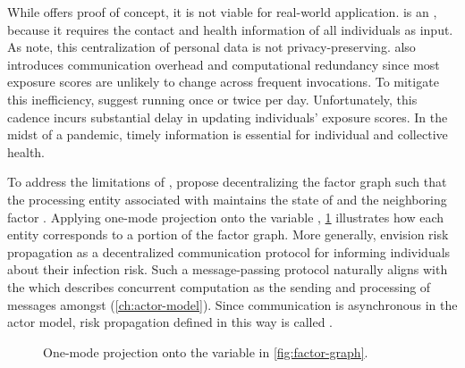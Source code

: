 While \cRiskPropagation offers proof of concept, it is not viable for real-world application. \cRiskPropagation is an  \citep{Cormen2022}, because it requires the contact and health information of all individuals as input. As \citet{Ayday2021} note, this centralization of personal data is not privacy-preserving. \cRiskPropagation also introduces communication overhead and computational redundancy since most exposure scores are unlikely to change across frequent invocations. To mitigate this inefficiency, \citet{Ayday2020} suggest running \cRiskPropagation once or twice per day. Unfortunately, this cadence incurs substantial delay in updating individuals' exposure scores. In the midst of a pandemic, timely information is essential for individual and collective health.

To address the limitations of \cRiskPropagation, \citet{Ayday2021} propose decentralizing the factor graph such that the processing entity associated with  maintains the state of  and the neighboring factor \verticesName. Applying one-mode projection onto the variable \verticesName \citep{Zhou2007}, \cref{fig:projected} illustrates how each entity corresponds to a portion of the factor graph. More generally, \citet{Ayday2021} envision risk propagation as a decentralized communication protocol for informing individuals about their infection risk. Such a message-passing protocol naturally aligns with the  which describes concurrent computation as the sending and processing of messages amongst  (\cref{ch:actor-model}). Since communication is asynchronous in the actor model, risk propagation defined in this way is called .

\begin{figure}[htbp]
\centering
{}
\caption[One-mode projection of the factor graph]{One-mode projection onto the variable \verticesName in \cref{fig:factor-graph}.}
\label{fig:projected}
\end{figure}

